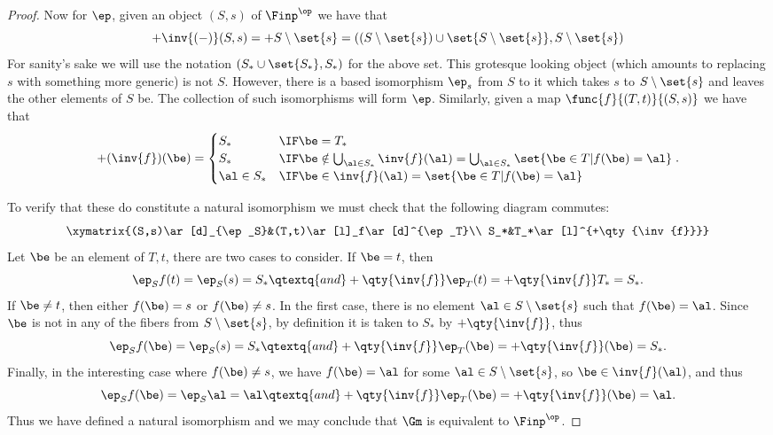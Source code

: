 \documentclass[../../main]{subfiles}
\begin{document}
\begin{proof}
	Now for \(\ep\), given an object \((S,s)\) of \(\Finp^\op\) we have that
	\[+\inv{(-)}(S,s)=+S\setminus\set{s}=((S\setminus\set{s})
	\cup\set{S\setminus\set{s}},S\setminus\set{s})\]
	For sanity's sake we will use the notation \((S_*\cup\set{S_*},S_*)\) for
	the above set. This grotesque looking object (which amounts to replacing
	\(s\) with something more generic) is not \(S\). However, there is a based
	isomorphism \(\ep_s\) from \(S\) to it which takes \(s\) to
	\(S\setminus\set{s}\) and leaves the other elements of \(S\) be. The
	collection of such isomorphisms will form \(\ep\). Similarly, given a map
	\(\func{f}{(T,t)}{(S,s)}\) we have that
	\[+(\inv{f})(\be)=\begin{cases}
			S_* & \IF \be=T_* \\
			S_* & \IF \be\notin\bigcup_{\al\in S_*}\inv{f}(\al)=
			\bigcup_{\al\in S_*}\set{\be\in T|f(\be)=\al}\\
			\al\in S_* & \IF \be\in\inv{f}(\al)=\set{\be\in T|f(\be)=\al}
	\end{cases}.\]

	To verify that these do constitute a natural isomorphism we must check that
	the following diagram commutes:
	\[\xymatrix{(S,s)\ar[d]_{\ep_S}&(T,t)\ar[l]_f\ar[d]^{\ep_T}\\
	S_*&T_*\ar[l]^{+\qty{\inv{f}}}}\]
	Let \(\be\) be an element of \(T,t\), there are two cases to consider. If
	\(\be=t\), then
	\[\ep_Sf(t)=\ep_S(s)=S_*\qtextq{and}
	+\qty{\inv{f}}\ep_T(t)=+\qty{\inv{f}}T_*=S_*.\] If \(\be\neq t\), then
	either \(f(\be)=s\) or \(f(\be)\neq s\). In the first case, there is no element
	\(\al\in S\setminus\set{s}\) such that \(f(\be)=\al\). Since \(\be\) is not in
	any of the fibers from \(S\setminus\set{s}\), by definition it is taken to
	\(S_*\) by \(+\qty{\inv{f}}\), thus \[\ep_Sf(\be)=\ep_S(s)=S_*\qtextq{and}
	+\qty{\inv{f}}\ep_T(\be)=+\qty{\inv{f}}(\be)=S_*.\] Finally, in the
	interesting case where \(f(\be)\neq s\), we have \(f(\be)=\al\) for some
	\(\al\in S\setminus\set{s}\), so \(\be\in\inv{f}(\al)\), and thus
	\[\ep_Sf(\be)=\ep_S\al=\al\qtextq{and}
	+\qty{\inv{f}}\ep_T(\be)=+\qty{\inv{f}}(\be)=\al.\] Thus we have defined a
	natural isomorphism and we may conclude that \(\Gm\) is equivalent to
	\(\Finp^\op\).
\end{proof}
\end{document}
